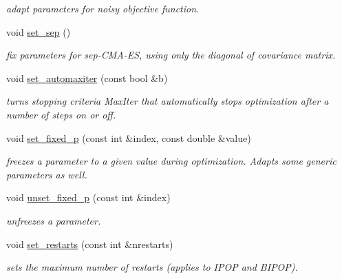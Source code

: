 \begin{DoxyCompactItemize}
\begin{DoxyCompactList}\small\item\em adapt parameters for noisy objective function. \end{DoxyCompactList}\item 
\hypertarget{classlibcmaes_1_1CMAParameters_a1f2115c14728278a946c358d8d26f30c}{void \hyperlink{classlibcmaes_1_1CMAParameters_a1f2115c14728278a946c358d8d26f30c}{set\-\_\-sep} ()}\label{classlibcmaes_1_1CMAParameters_a1f2115c14728278a946c358d8d26f30c}

\begin{DoxyCompactList}\small\item\em fix parameters for sep-\/\-C\-M\-A-\/\-E\-S, using only the diagonal of covariance matrix. \end{DoxyCompactList}\item 
void \hyperlink{classlibcmaes_1_1CMAParameters_a7fcd592c259dca6716fdbe735fd1b837}{set\-\_\-automaxiter} (const bool \&b)
\begin{DoxyCompactList}\small\item\em turns stopping criteria Max\-Iter that automatically stops optimization after a number of steps on or off. \end{DoxyCompactList}\item 
void \hyperlink{classlibcmaes_1_1CMAParameters_a73af8cdc07dc3388c40a27ddbdea96b4}{set\-\_\-fixed\-\_\-p} (const int \&index, const double \&value)
\begin{DoxyCompactList}\small\item\em freezes a parameter to a given value during optimization. Adapts some generic parameters as well. \end{DoxyCompactList}\item 
void \hyperlink{classlibcmaes_1_1CMAParameters_adb4f043e62081a8910d54f87db3b6ef4}{unset\-\_\-fixed\-\_\-p} (const int \&index)
\begin{DoxyCompactList}\small\item\em unfreezes a parameter. \end{DoxyCompactList}\item 
void \hyperlink{classlibcmaes_1_1CMAParameters_a105789bdd00467411107db57302028f2}{set\-\_\-restarts} (const int \&nrestarts)
\begin{DoxyCompactList}\small\item\em sets the maximum number of restarts (applies to I\-P\-O\-P and B\-I\-P\-O\-P). \end{DoxyCompactList}\end{DoxyCompactItemize}
